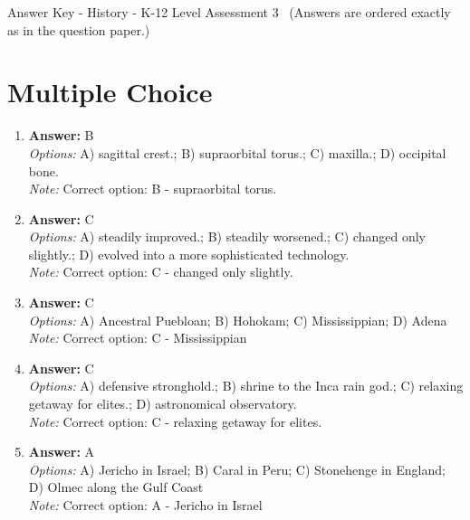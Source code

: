 \documentclass[12pt]{article}
\begin{document}
\begin{center}
Answer Key - History - K-12 Level Assessment 3 \
\small (Answers are ordered exactly as in the question paper.)
\end{center}

\section*{Multiple Choice}
\begin{enumerate}[label=\arabic*.]
\item \textbf{Answer:} B
\\ \textit{Options:} A) sagittal crest.; B) supraorbital torus.; C) maxilla.; D) occipital bone.
\\ \textit{Note:} Correct option: B - supraorbital torus.
\item \textbf{Answer:} C
\\ \textit{Options:} A) steadily improved.; B) steadily worsened.; C) changed only slightly.; D) evolved into a more sophisticated technology.
\\ \textit{Note:} Correct option: C - changed only slightly.
\item \textbf{Answer:} C
\\ \textit{Options:} A) Ancestral Puebloan; B) Hohokam; C) Mississippian; D) Adena
\\ \textit{Note:} Correct option: C - Mississippian
\item \textbf{Answer:} C
\\ \textit{Options:} A) defensive stronghold.; B) shrine to the Inca rain god.; C) relaxing getaway for elites.; D) astronomical observatory.
\\ \textit{Note:} Correct option: C - relaxing getaway for elites.
\item \textbf{Answer:} A
\\ \textit{Options:} A) Jericho in Israel; B) Caral in Peru; C) Stonehenge in England; D) Olmec along the Gulf Coast
\\ \textit{Note:} Correct option: A - Jericho in Israel
\end{enumerate}
\end{document}

